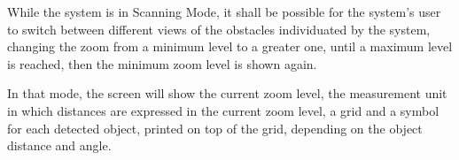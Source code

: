While the system is in Scanning Mode,  it shall be possible for the system's user to switch between different views of the obstacles individuated by the system, changing the zoom from a minimum level to a greater one, until a maximum level is reached, then the minimum zoom level is shown again.

In that mode, the screen will show the current zoom level, the measurement unit in which distances are expressed in the current zoom level, a grid and a symbol for each detected object, printed on top of the grid, depending on the object distance and angle.
































